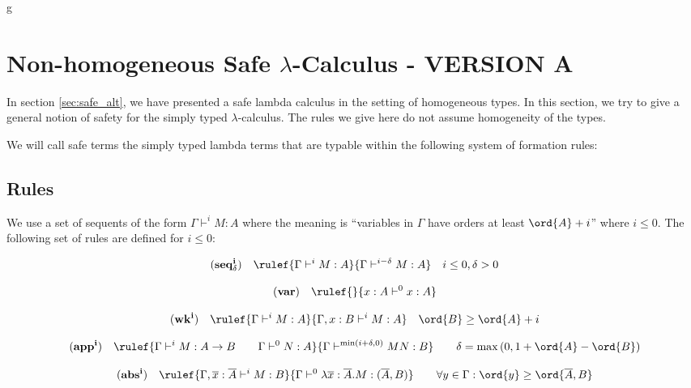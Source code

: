 g\clearpage
\section{Non-homogeneous Safe $\lambda$-Calculus - VERSION A}

In section \ref{sec:safe_alt}, we have presented a safe lambda calculus in the setting of homogeneous types.
In this section, we try to give a general notion of safety for the simply typed $\lambda$-calculus.
The rules we give here do not assume homogeneity of the types.

We will call safe terms the simply typed lambda terms that are typable within the following system of formation rules:

\subsection{Rules}

 We use a set of sequents of the form $\Gamma \vdash^{i} M :
A$ where the meaning is ``variables in $\Gamma$ have orders at least
$\ord{A}+i$'' where $i \leq 0$. The following set of rules are
defined for $i \leq 0$:

$$ \mathbf{(seq^i_\delta)} \quad \rulef{\Gamma \vdash^{i} M : A}{\Gamma \vdash^{i-\delta} M : A} \quad i \leq 0, \delta > 0  $$

$$ \mathbf{(var)} \quad  \rulef{}{x : A\vdash^{0} x : A} $$

$$ \mathbf{(wk^i)} \quad  \rulef{\Gamma \vdash^i M : A}{\Gamma , x : B \vdash^i M : A} \quad \ord{B} \geq \ord{A} + i $$

$$ \mathbf{(app^i)} \quad  \rulef{\Gamma \vdash^i M : A\rightarrow B
                                        \qquad \Gamma \vdash^{0} N : A}
                                   {\Gamma  \vdash^{\min(i+\delta,0)} M N : B}
                                    \qquad
                                   \delta = \max\left(0, 1 + \ord{A} - \ord{B}\right)$$

$$ \mathbf{(abs^i)} \quad  \rulef{\Gamma, \overline{x} : \overline{A} \vdash^{i} M : B}
                                   {\Gamma  \vdash^{0} \lambda \overline{x} : \overline{A} . M : (\overline{A},B)} \qquad
                                       \forall y \in \Gamma : \ord{y} \geq \ord{\overline{A},B}\\
                                   $$


